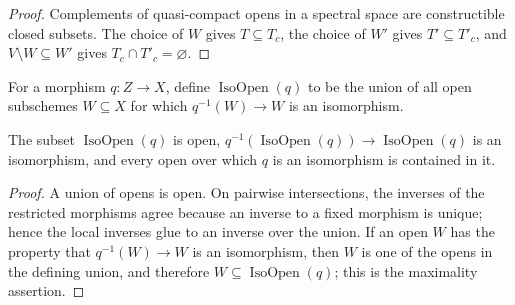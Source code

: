 \begin{proof}
  Complements of quasi-compact opens in a spectral space are constructible
  closed subsets.  The choice of $W$ gives $T\subseteq T_c$, the choice of
  $W'$ gives $T'\subseteq T'_c$, and $V\setminus W\subseteq W'$ gives
  $T_c\cap T'_c=\varnothing$.
\end{proof}

\begin{definition}
  \label{def:nagata-maximal-isomorphism-open}
  \leanok

  For a morphism $q\colon Z\to X$, define $\operatorname{IsoOpen}(q)$ to be
  the union of all open subschemes $W\subseteq X$ for which
  $q^{-1}(W)\to W$ is an isomorphism.
\end{definition}

\begin{lemma}
  \label{lemma:nagata-maximal-isomorphism-open}
  \leanok

  The subset $\operatorname{IsoOpen}(q)$ is open,
  $q^{-1}(\operatorname{IsoOpen}(q))\to\operatorname{IsoOpen}(q)$ is an
  isomorphism, and every open over which $q$ is an isomorphism is contained in
  it.
\end{lemma}

\begin{proof}
  \leanok
  A union of opens is open.  On pairwise intersections, the inverses of the
  restricted morphisms agree because an inverse to a fixed morphism is unique;
  hence the local inverses glue to an inverse over the union.  If an open
  $W$ has the property that $q^{-1}(W)\to W$ is an isomorphism, then $W$ is
  one of the opens in the defining union, and therefore $W\subseteq
  \operatorname{IsoOpen}(q)$; this is the maximality assertion.
\end{proof}


